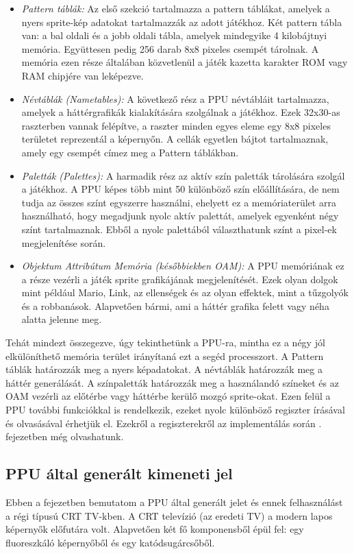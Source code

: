 \begin{itemize}
	\item \emph{Pattern táblák:} Az első szekció tartalmazza a pattern táblákat, amelyek a nyers sprite-kép adatokat tartalmazzák az adott játékhoz. Két pattern tábla van: a bal oldali és a jobb oldali tábla, amelyek mindegyike 4 kilobájtnyi memória. Együttesen pedig 256 darab 8x8 pixeles csempét tárolnak. A memória ezen része általában közvetlenül 
	a játék kazetta karakter ROM vagy RAM chipjére van leképezve.
	\item \emph{Névtáblák (Nametables):} A következő rész a PPU névtábláit tartalmazza, amelyek a háttérgrafikák kialakítására szolgálnak a játékhoz. Ezek 32x30-as raszterben vannak felépítve, a raszter minden egyes eleme egy 8x8 pixeles területet reprezentál a képernyőn. A cellák egyetlen bájtot tartalmaznak, amely egy csempét címez meg a Pattern táblákban.  
	\item \emph{Paletták (Palettes):} A harmadik rész az aktív szín paletták tárolására szolgál a játékhoz. A PPU képes több mint 50 különböző szín előállítására, de nem tudja az összes színt egyszerre használni, ehelyett ez a memóriaterület arra használható, hogy megadjunk nyolc aktív palettát, amelyek egyenként négy színt tartalmaznak. Ebből a nyolc palettából választhatunk színt a pixel-ek megjelenítése során.
	\item \emph{Objektum Attribútum Memória (későbbiekben OAM):} A PPU memóriának ez a része vezérli a játék sprite grafikájának megjelenítését. Ezek olyan dolgok mint például Mario, Link, az ellenségek és az olyan effektek, mint a tűzgolyók és a robbanások. Alapvetően bármi, ami a háttér grafika felett vagy néha alatta jelenne meg.
\end{itemize}

Tehát mindezt összegezve, úgy tekinthetünk a PPU-ra, mintha ez a négy jól elkülöníthető memória terület irányítaná ezt a segéd processzort. A Pattern táblák határozzák meg a nyers képadatokat. A névtáblák határozzák meg a háttér generálását. A színpaletták határozzák meg a használandó színeket és az OAM vezérli az előtérbe vagy háttérbe kerülő mozgó sprite-okat.
Ezen felül a PPU további funkciókkal is rendelkezik, ezeket nyolc különböző regiszter írásával és olvasásával érhetjük el. Ezekről a regiszterekről az implementálás során . fejezetben még olvashatunk.

	\subsection{PPU által generált kimeneti jel}
	\label{subsec:PPU-CRT}
	Ebben a fejezetben bemutatom a PPU által generált jelet és ennek felhasználást a régi típusú CRT TV-kben. A CRT televízió (az eredeti TV) a modern lapos képernyők előfutára volt. Alapvetően két fő komponensből épül fel: egy fluoreszkáló képernyőből és egy katódsugárcsőből. 
	
